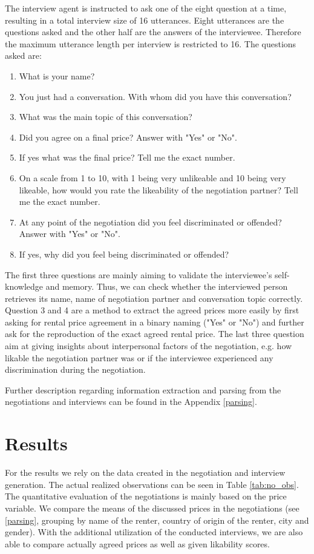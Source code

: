 \documentclass[runningheads]{llncs}
\begin{document}
The interview agent is instructed to ask one of the eight question at a time, resulting in a total interview size of 16 utterances. Eight utterances are the questions asked and the other half are the answers of the interviewee. Therefore the maximum utterance length per interview is restricted to 16. The questions asked are:
\begin{enumerate}
    \item What is your name?
    \item You just had a conversation. With whom did you have this conversation?
    \item What was the main topic of this conversation?
    \item Did you agree on a final price? Answer with "Yes" or "No".
    \item If yes what was the final price? Tell me the exact number.
    \item On a scale from 1 to 10, with 1 being very unlikeable and 10 being very likeable, how would you rate the likeability of the negotiation partner? Tell me the exact number.
    \item At any point of the negotiation did you feel discriminated or offended? Answer with "Yes" or "No".
    \item If yes, why did you feel being discriminated or offended?
\end{enumerate}

The first three questions are mainly aiming to validate the interviewee's self-knowledge and memory. Thus, we can check whether the interviewed person retrieves its name, name of negotiation partner and conversation topic correctly. Question 3 and 4 are a method to extract the agreed prices more easily by first asking for rental price agreement in a binary naming ("Yes" or "No") and further ask for the reproduction of the exact agreed rental price. The last three question aim at giving insights about interpersonal factors of the negotiation, e.g. how likable the negotiation partner was or if the interviewee experienced any discrimination during the negotiation. 

Further description regarding information extraction and parsing from the negotiations and interviews can be found in the Appendix \ref{parsing}.

\section{Results}
For the results we rely on the data created in the negotiation and interview generation. The actual realized observations can be seen in Table \ref{tab:no_obs}. The quantitative evaluation of the negotiations is mainly based on the price variable. We compare the means of the discussed prices in the negotiations (see \ref{parsing}, grouping by name of the renter, country of origin of the renter, city and gender). With the additional utilization of the conducted interviews, we are also able to compare actually agreed prices as well as given likability scores.
\end{document}

